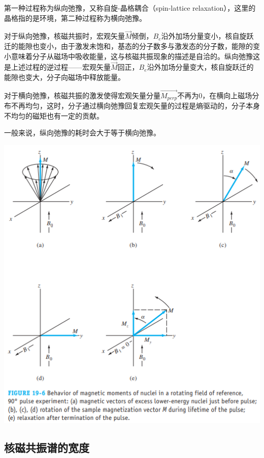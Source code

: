 第一种过程称为纵向弛豫，又称自旋-晶格耦合（spin-lattice relaxation），这里的晶格指的是环境，第二种过程称为横向弛豫。

对于纵向弛豫，核磁共振时，宏观矢量$\overrightarrow{M}$倾倒，$B_e$沿外加场分量变小，核自旋跃迁的能隙也变小，由于激发未饱和，基态的分子数多与激发态的分子数，能隙的变小意味着分子从磁场中吸收能量，这与核磁共振现象的描述是自洽的。纵向弛豫这是上述过程的逆过程——宏观矢量$\overrightarrow{M}$回正，$B_e$沿外加场分量变大，核自旋跃迁的能隙也变大，分子向磁场中释放能量。

对于横向弛豫，核磁共振的激发使得宏观矢量分量$\overrightarrow{M_{perp}}$不再为0，在横向上磁场分布不再均匀，这时，分子通过横向弛豫回复宏观矢量的过程是熵驱动的，分子本身不均匀的磁矩也有一定的贡献。

一般来说，纵向弛豫的耗时会大于等于横向弛豫。

\begin{center}
\includegraphics[scale=0.7]{./fig/hc/hc3.png}
\end{center}

\subsection{核磁共振谱的宽度}

